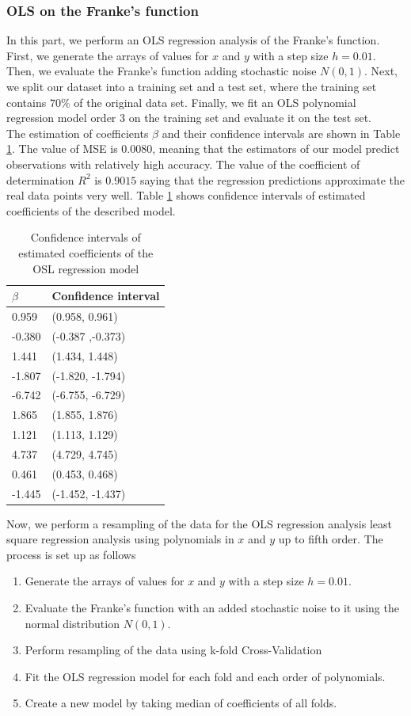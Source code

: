 \documentclass [11pt]{article}
\begin{document}
\subsubsection{OLS on the Franke's function}
In this part, we perform an OLS regression analysis of the Franke's function. First, we generate the arrays of values for $x$ and $y$ with a step size $h=0.01$. Then, we evaluate the Franke's function adding stochastic noise $N(0,1)$. Next, we split our dataset into a training set and a test set, where the training set contains $70\%$ of the original data set. Finally, we fit an OLS polynomial regression model order $3$ on the training set and evaluate it on the test set. \\
The estimation of coefficients $\beta$ and their confidence intervals are shown in Table \ref{tab:olsfrane1}. The value of MSE is $0.0080$, meaning that the estimators of our model predict observations with relatively high accuracy. The value of the coefficient of determination $R^{2}$ is $0.9015$ saying that the regression predictions approximate the real data points very well. Table \ref{tab:olsfrane1} shows confidence intervals of estimated coefficients of the described model.
\begin{table}[H]
\centering
\begin{tabular}{ll}
\hline
$\beta$ & Confidence interval \\ \hline
0.959   & (0.958, 0.961)     \\
-0.380  & (-0.387 ,-0.373)   \\
1.441   & (1.434, 1.448)     \\
-1.807  & (-1.820,  -1.794)  \\
-6.742  & (-6.755, -6.729)   \\
1.865   & (1.855, 1.876)     \\
1.121   & (1.113, 1.129)     \\
4.737   & (4.729, 4.745)     \\
0.461   & (0.453, 0.468)     \\
-1.445  & (-1.452, -1.437)   \\ \hline
\end{tabular}
\caption{Confidence intervals of estimated coefficients of the OSL regression model}
\label{tab:olsfrane1}
\end{table}
Now, we perform a resampling of the data for the OLS regression analysis least square regression analysis using polynomials in $x$ and $y$ up to fifth order. The process is set up as follows
\begin{enumerate}
\item Generate the arrays of values for $x$ and $y$ with a step size $h=0.01$. 
\item Evaluate the Franke's function with an added stochastic noise to it using  the normal distribution $N(0,1)$.
\item Perform resampling of the data using k-fold Cross-Validation
\item Fit the OLS regression model for each fold and each order of polynomials.
\item Create a new model by taking median of coefficients of all folds.
\end{enumerate}
\end{document}
